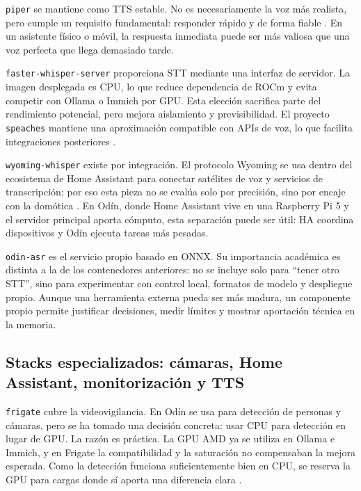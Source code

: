 \texttt{piper} se mantiene como TTS estable. No es necesariamente la voz más realista, pero cumple un requisito fundamental: responder rápido y de forma fiable \citep{linuxserverPiperDocs}. En un asistente físico o móvil, la respuesta inmediata puede ser más valiosa que una voz perfecta que llega demasiado tarde.

\texttt{faster-whisper-server} proporciona STT mediante una interfaz de servidor. La imagen desplegada es CPU, lo que reduce dependencia de ROCm y evita competir con Ollama o Immich por GPU. Esta elección sacrifica parte del rendimiento potencial, pero mejora aislamiento y previsibilidad. El proyecto \texttt{speaches} mantiene una aproximación compatible con APIs de voz, lo que facilita integraciones posteriores \citep{speachesDocs}.

\texttt{wyoming-whisper} existe por integración. El protocolo Wyoming se usa dentro del ecosistema de Home Assistant para conectar satélites de voz y servicios de transcripción; por eso esta pieza no se evalúa solo por precisión, sino por encaje con la domótica \citep{wyomingProtocolRepo,wyomingWhisperRepo,homeAssistantDocs}. En Odín, donde Home Assistant vive en una Raspberry Pi 5 y el servidor principal aporta cómputo, esta separación puede ser útil: HA coordina dispositivos y Odín ejecuta tareas más pesadas.

\texttt{odin-asr} es el servicio propio basado en ONNX. Su importancia académica es distinta a la de los contenedores anteriores: no se incluye solo para ``tener otro STT'', sino para experimentar con control local, formatos de modelo y despliegue propio. Aunque una herramienta externa pueda ser más madura, un componente propio permite justificar decisiones, medir límites y mostrar aportación técnica en la memoria.

\subsection{Stacks especializados: cámaras, Home Assistant, monitorización y TTS}
\texttt{frigate} cubre la videovigilancia. En Odín se usa para detección de personas y cámaras, pero se ha tomado una decisión concreta: usar CPU para detección en lugar de GPU. La razón es práctica. La GPU AMD ya se utiliza en Ollama e Immich, y en Frigate la compatibilidad y la saturación no compensaban la mejora esperada. Como la detección funciona suficientemente bien en CPU, se reserva la GPU para cargas donde sí aporta una diferencia clara \citep{frigateInstallDocs,rocmDocs}.

